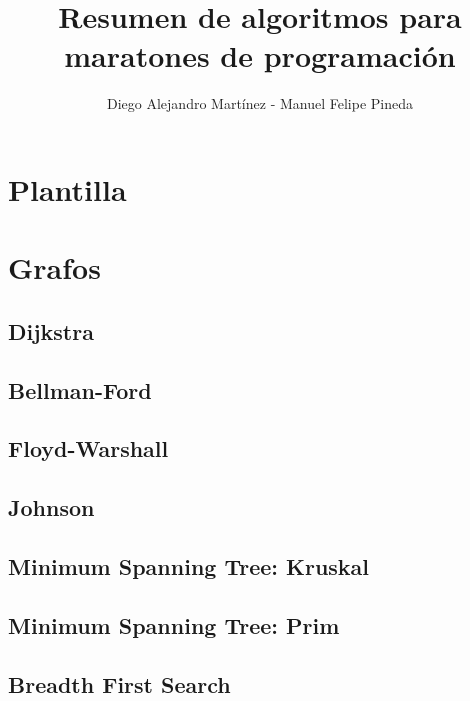 \documentclass[10pt,letterpaper,twocolumn,twosided]{article}
\newcommand{\codigofuente}[1]{

\dotfill
}
\begin{document}
\title{Resumen de algoritmos para maratones de programación}
\author{Diego Alejandro Martínez - Manuel Felipe Pineda}
\maketitle

\tableofcontents
{}

\newpage

\section{Plantilla}
\codigofuente{../src/template.${EXT}}

\section{Grafos}

\subsection{Dijkstra}

\subsection{Bellman-Ford}

\subsection{Floyd-Warshall}

\subsection{Johnson}

\subsection{Minimum Spanning Tree: Kruskal}

\subsection{Minimum Spanning Tree: Prim}

\subsection{Breadth First Search}
\end{document}
